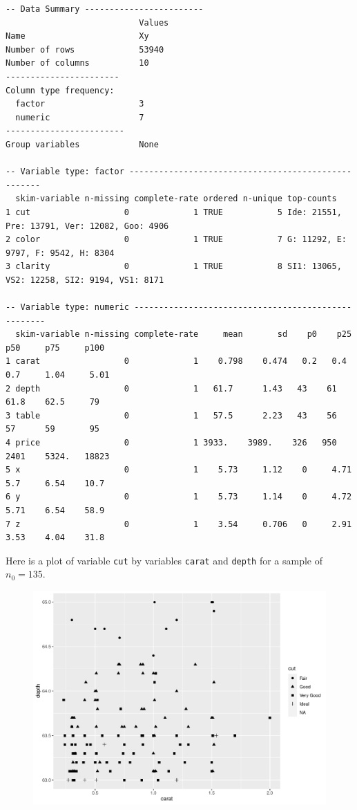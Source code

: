 \documentclass[12pt]{article}
\begin{document}
\begin{Verbatim}[frame=single,fontsize=\scriptsize]
-- Data Summary ------------------------
                           Values
Name                       Xy    
Number of rows             53940 
Number of columns          10    
-----------------------          
Column type frequency:           
  factor                   3     
  numeric                  7     
------------------------         
Group variables            None  

-- Variable type: factor ----------------------------------------------------
  skim-variable n-missing complete-rate ordered n-unique top-counts                                   
1 cut                   0             1 TRUE           5 Ide: 21551, Pre: 13791, Ver: 12082, Goo: 4906
2 color                 0             1 TRUE           7 G: 11292, E: 9797, F: 9542, H: 8304          
3 clarity               0             1 TRUE           8 SI1: 13065, VS2: 12258, SI2: 9194, VS1: 8171 

-- Variable type: numeric ----------------------------------------------------
  skim-variable n-missing complete-rate     mean       sd    p0    p25     p50     p75     p100 
1 carat                 0             1    0.798    0.474   0.2   0.4     0.7     1.04     5.01 
2 depth                 0             1   61.7      1.43   43    61      61.8    62.5     79    
3 table                 0             1   57.5      2.23   43    56      57      59       95   
4 price                 0             1 3933.    3989.    326   950    2401    5324.   18823   
5 x                     0             1    5.73     1.12    0     4.71    5.7     6.54    10.7  
6 y                     0             1    5.73     1.14    0     4.72    5.71    6.54    58.9  
7 z                     0             1    3.54     0.706   0     2.91    3.53    4.04    31.8  
\end{Verbatim}
\pagebreak


Here is a plot of variable \texttt{cut} by variables \texttt{carat} and \texttt{depth} for a sample of $n_0 = 135$.

\begin{figure}[htp]
\centering
\includegraphics[width=5.2in]{caratdepthcut1}
\end{figure}
\end{document}
